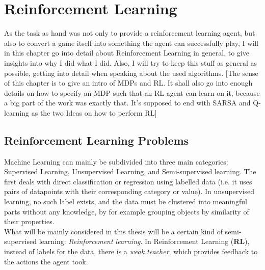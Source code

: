 
\chapter{Reinforcement Learning} %

\label{Reinforcement Learning} %


\newcommand{\keyword}[1]{\textit{#1}}
\newcommand{\tabhead}[1]{\textbf{#1}}
\newcommand{\code}[1]{\texttt{#1}}
\newcommand{\file}[1]{\texttt{\bfseries#1}}
\newcommand{\option}[1]{\texttt{\itshape#1}}
\newcommand{\batchnorm}{batch normalization }
\newcommand{\Batchnorm}{Batch normalization }


As the task as hand was not only to provide a reinforcement learning agent, but also to convert a game itself into something the agent can successfully play, I will in this chapter go into detail about Reinforcement Learning in general, to give insights into why I did what I did. Also, I will try to keep this stuff as general as possible, getting into detail when speaking about the used algorithms.
[The sense of this chapter is to give an intro of MDPs and RL. It shall also go into enough details on how to specify an MDP such that an RL agent can learn on it, because a big part of  the work was exactly that. It’s supposed to end with SARSA and Q-learning as the two Ideas on how to perform RL]

\section{Reinforcement Learning Problems}

Machine Learning can mainly be subdivided into three main categories: Supervised Learning, Unsupervised Learning, and Semi-supervised learning. The first deals with direct classification or regression using labelled data (i.e. it uses pairs of datapoints with their corresponding category or value). In unsupervised learning, no such label exists, and the data must be clustered into meaningful parts without any knowledge, by for example grouping objects by similarity of their properties.\\
What will be mainly considered in this thesis will be a certain kind of semi-supervised learning: \keyword{Reinforcement learning}. In Reinforcement Learning (\textbf{RL}), instead of labels for the data, there is a \textit{weak teacher}, which provides feedback to the actions the agent took.

